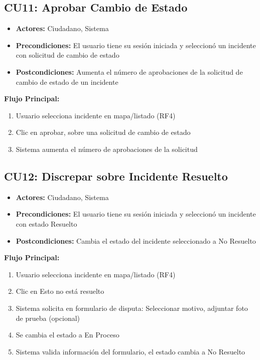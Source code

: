 \begin{multicols}{2}
\subsection*{CU11: Aprobar Cambio de Estado}
\begin{itemize}
    \item \textbf{Actores:} Ciudadano, Sistema
    \item \textbf{Precondiciones:} El usuario tiene su sesión iniciada y seleccionó un incidente con solicitud de cambio de estado
    \item \textbf{Postcondiciones:} Aumenta el número de aprobaciones de la solicitud de cambio de estado de un incidente
\end{itemize}
\textbf{Flujo Principal:}
\begin{enumerate}
    \item Usuario selecciona incidente en mapa/listado (RF4)
    \item Clic en aprobar, sobre una solicitud de cambio de estado
    \item Sistema aumenta el número de aprobaciones de la solicitud
\end{enumerate}

\subsection*{CU12: Discrepar sobre Incidente Resuelto}
\begin{itemize}
    \item \textbf{Actores:} Ciudadano, Sistema
    \item \textbf{Precondiciones:} El usuario tiene su sesión iniciada y seleccionó un incidente con estado Resuelto
    \item \textbf{Postcondiciones:} Cambia el estado del incidente seleccionado a No Resuelto
\end{itemize}
\textbf{Flujo Principal:}
\begin{enumerate}
    \item Usuario selecciona incidente en mapa/listado (RF4)
    \item Clic en Esto no está resuelto
    \item Sistema solicita en formulario de disputa: Seleccionar motivo, adjuntar foto de prueba (opcional)
    \item Se cambia el estado a En Proceso
    \item Sistema valida información del formulario, el estado cambia a No Resuelto
     

\end{enumerate}
\end{multicols}
